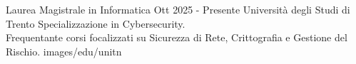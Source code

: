 \EducationEntry
{Laurea Magistrale in Informatica}
{Ott 2025 - Presente}
{Università degli Studi di Trento}
{Specializzazione in Cybersecurity.\\
Frequentante corsi focalizzati su Sicurezza di Rete, Crittografia e Gestione del Rischio.}
{images/edu/unitn}
